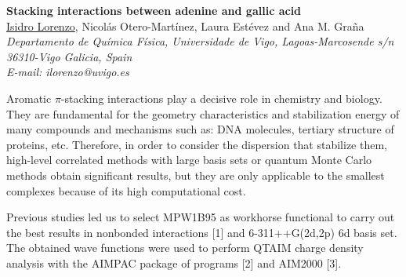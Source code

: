 \newpage
\setcounter{figure}{0}
\begin{center}
{\bf \Large
Stacking interactions between adenine and gallic acid
}
\\
\vspace{0.5cm}
\underline{Isidro Lorenzo}, Nicolás Otero-Martínez, Laura Estévez and Ana M. Graña
\\
\vspace{0.5cm}
{\it
Departamento de Química Física, Universidade de Vigo, Lagoas-Marcosende s/n 36310-Vigo
Galicia, Spain
}
\\
\vspace{0.5cm}
{\it E-mail: ilorenzo@uvigo.es}
\\
\vspace{0.5cm}
\end{center}
Aromatic $\pi$-stacking interactions play a decisive role in chemistry and
biology. They are fundamental for the geometry characteristics and stabilization
energy of many compounds and mechanisms such as: DNA molecules, tertiary
structure of proteins, etc. Therefore, in order to consider the dispersion that stabilize
them, high-level correlated methods with large basis sets or quantum Monte Carlo
methods obtain significant results, but they are only applicable to the smallest
complexes because of its high computational cost.

Previous studies led us to select MPW1B95 as workhorse functional to carry
out the best results in nonbonded interactions [1] and 6-311++G(2d,2p) 6d basis set.
The obtained wave functions were used to perform QTAIM charge density analysis
with the AIMPAC package of programs [2] and AIM2000 [3].

